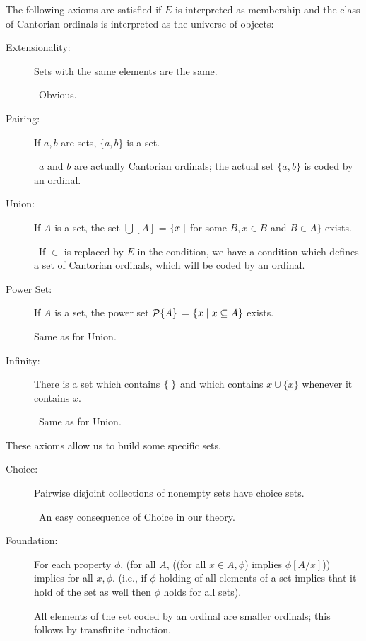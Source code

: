 The following axioms are satisfied if $E$ is interpreted as
membership and the class of Cantorian ordinals is interpreted as the universe of
objects:

\begin{description}
 \item[\fdescr Extensionality:]  Sets with the same
   elements are the same.

   \preuve\ Obvious.
   \finpreuve

 \item[\fdescr Pairing:]  If $a,b$ are sets, $\{a,b\}$ is a set.

   \preuve\ $a$ and $b$ are actually Cantorian
   ordinals; the actual set $\{a,b\}$
   is coded by an ordinal.
   \finpreuve

 \item[\fdescr Union:]  If $A$ is a set, the set $\bigcup[A]$
   = $\{x \mid$ for some $B, x \in B$ and $B \in A\}$ exists.

   \preuve\ If $\in$ is replaced by $E$ in the condition, we have a condition
   which defines a set of Cantorian ordinals, which will
   be coded by an ordinal.
   \finpreuve

 \item[\fdescr Power Set:]  If $A$ is a set, the
   power set ${\cal P}\{A\}$ = $\{x \mid x \subseteq A\}$ exists. 

   \preuve Same as for Union.
   \finpreuve

 \item[\fdescr Infinity:]  There is a set which contains
   $\mbox{$\{\;\}$}$ and which contains $x \cup \{x\}$ whenever it contains $x$.

   \preuve\ Same as for Union.
   \finpreuve
\end{description}

These axioms allow us to build some specific sets.

\begin{description}
 \item[\fdescr Choice:]  Pairwise
   disjoint collections of nonempty sets have choice sets.

   \preuve\ An easy consequence of Choice in our theory.
   \finpreuve

 \item[\fdescr Foundation:] For each property
   $\phi$, (for all $A$, ((for all $x \in A, \phi$) implies $\phi[A/x]$))
   implies for all $x, \phi$. (i.e., if $\phi$ holding of all elements of a set
   implies that it hold of the set as well then $\phi$ holds for all sets).

   \preuve All elements of the set coded by an ordinal are smaller
   ordinals; this follows by
   transfinite induction. 
   \finpreuve
\end{description}

